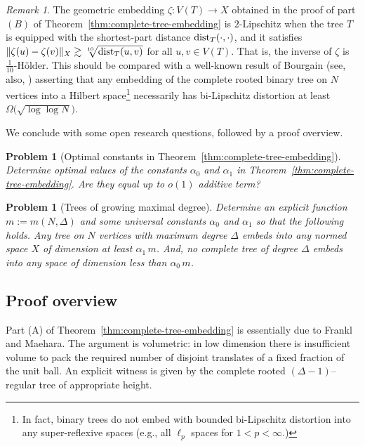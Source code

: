 \documentclass[11pt,leqno]{amsart}
\newtheorem{problem}[theorem]{Problem}
\theoremstyle{remark}
\newtheorem{remark}[theorem]{Remark}
\theoremstyle{plain}
\def\dist{{\rm dist}}
\def\dist{{\rm dist}}
\begin{document}
\begin{remark} \label{rem1.3}
The geometric embedding $\zeta\colon V(T)\to X$ obtained in the proof of part $(B)$ of Theorem~\ref{thm:complete-tree-embedding} is $2$-Lipschitz when the tree $T$ is equipped with the shortest-part distance $\dist_T(\cdot,\cdot)$, and it satisfies
$\|\zeta(u)-\zeta(v)\|_X \gtrsim \sqrt[10]{\dist_T(u,v)}$ for all $u,v\in V(T)$. That is, the inverse of $\zeta$ is $\frac{1}{10}\text{-H\"{o}lder}$. This should be compared with a well-known result of Bourgain \cite{Bou86} (see, also, \cite{Ma99}) asserting that any embedding of the complete rooted binary tree on $N$ vertices into a Hilbert space\footnote{In fact, binary trees do not embed with bounded bi-Lipschitz distortion into any super-reflexive spaces (e.g., all $\ell_p$ spaces for $1<p<\infty$.)}
necessarily has bi-Lipschitz distortion at least $\Omega\big(\sqrt{\log\log N}\big)$.\!
\end{remark}

We conclude with some open research questions, followed by a proof overview.

\begin{problem}[Optimal constants in Theorem~\ref{thm:complete-tree-embedding}]
Determine optimal values of the constants $\alpha_0$ and $\alpha_1$ in Theorem~\ref{thm:complete-tree-embedding}. Are they equal up to $o(1)$ additive term?
\end{problem}

\begin{problem}[Trees of growing maximal degree]
Determine an explicit function $m := m(N,\Delta)$ and some universal constants $\alpha_0$ and $\alpha_1$ so that the following holds. Any tree on $N$ vertices with maximum degree $\Delta$ embeds into \textit{any} normed space $X$ of dimension at least $\alpha_1\, m$. And, no complete tree of degree $\Delta$ embeds into any space of dimension less than $\alpha_0\, m$.
\end{problem}

\subsection*{Proof overview}

Part (A) of Theorem~\ref{thm:complete-tree-embedding} is essentially due to Frankl and Maehara. The argument is volumetric: in low dimension there is insufficient volume to pack the required number of disjoint translates of a fixed fraction of the unit ball. An explicit witness is given by the complete rooted $(\Delta-1)$--regular tree of appropriate height.
\end{document}
